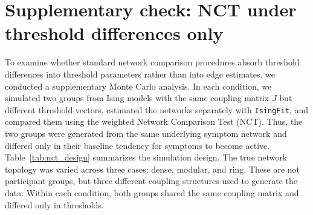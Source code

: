 \documentclass[man,12pt,floatsintext]{apa7}
\begin{document}
\section{Supplementary check: NCT under threshold differences only}\label{app:nct}
To examine whether standard network comparison procedures absorb threshold differences into threshold parameters rather than into edge estimates, we conducted a supplementary Monte Carlo analysis. In each condition, we simulated two groups from Ising models with the same coupling matrix \(J\) but different threshold vectors, estimated the networks separately with \texttt{IsingFit}, and compared them using the weighted Network Comparison Test (NCT). Thus, the two groups were generated from the same underlying symptom network and differed only in their baseline tendency for symptoms to become active.
Table~\ref{tab:nct_design} summarizes the simulation design. The true network topology was varied across three cases: dense, modular, and ring. These are not participant groups, but three different coupling structures used to generate the data. Within each condition, both groups shared the same coupling matrix and differed only in thresholds.
\end{document}
